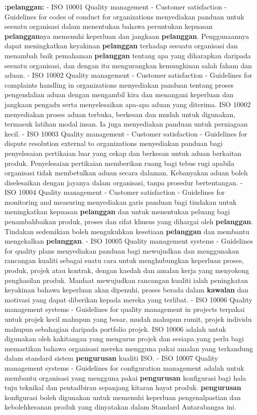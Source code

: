 \documentclass{article}
\begin{document}
\textbf{:pelanggan:} - ISO 10001 Quality management - Customer satisfaction - Guidelines for codes of
 conduct for organizations menyediakan panduan untuk sesuatu organisasi dalam
 menentukan bahawa peruntukan kepuasan \textbf{pelanggan}nya memenuhi keperluan dan
 jangkaan \textbf{pelanggan}. Penggunaannya dapat meningkatkan keyakinan \textbf{pelanggan}
 terhadap sesuatu organisasi dan menambah baik pemahaman \textbf{pelanggan} tentang apa
 yang diharapkan daripada sesuatu organisasi, dan dengan itu mengurangkan
 kemungkinan salah faham dan aduan.
- ISO 10002 Quality management - Customer satisfaction - Guidelines for complaints
 handling in organizations menyediakan panduan tentang proses pengendalian aduan
 dengan mengambil kira dan menangani keperluan dan jangkaan pengadu serta
 menyelesaikan apa-apa aduan yang diterima. ISO 10002 menyediakan proses aduan
 terbuka, berkesan dan mudah untuk digunakan, termasuk latihan modal insan. Ia juga
 menyediakan panduan untuk perniagaan kecil.
- ISO 10003 Quality management - Customer satisfaction - Guidelines for dispute
 resolution external to organizations menyediakan panduan bagi penyelesaian pertikaian
 luar yang cekap dan berkesan untuk aduan berkaitan produk. Penyelesaian pertikaian
 memberikan ruang bagi tebus rugi apabila organisasi tidak membetulkan aduan secara
 dalaman. Kebanyakan aduan boleh diselesaikan dengan jayanya dalam organisasi,
 tanpa prosedur bertentangan.
- ISO 10004 Quality management - Customer satisfaction - Guidelines for monitoring and
 measuring menyediakan garis panduan bagi tindakan untuk meningkatkan kepuasan
 \textbf{pelanggan} dan untuk menentukan peluang bagi penambahbaikan produk, proses dan
 sifat khusus yang dihargai oleh \textbf{pelanggan}. Tindakan sedemikian boleh mengukuhkan
 kesetiaan \textbf{pelanggan} dan membantu mengekalkan \textbf{pelanggan}.
- ISO 10005 Quality management systems - Guidelines for quality plans menyediakan
 panduan bagi mewujudkan dan menggunakan rancangan kualiti sebagai suatu cara
 untuk menghubungkan keperluan proses, produk, projek atau kontrak, dengan kaedah
 dan amalan kerja yang menyokong penghasilan produk. Manfaat mewujudkan rancangan
 kualiti ialah peningkatan keyakinan bahawa keperluan akan dipenuhi, proses berada
 dalam \textbf{kawalan} dan motivasi yang dapat diberikan kepada mereka yang terlibat.
- ISO 10006 Quality management systems - Guidelines for quality management in projects
 terpakai untuk projek kecil mahupun yang besar, mudah mahupun rumit, projek individu
 mahupun sebahagian daripada portfolio projek. ISO 10006 adalah untuk digunakan oleh
 kakitangan yang mengurus projek dan sesiapa yang perlu bagi memastikan bahawa
 organisasi mereka mengguna pakai amalan yang terkandung dalam standard sistem
 \textbf{pengurusan} kualiti ISO.
- ISO 10007 Quality management systems - Guidelines for configuration management
 adalah untuk membantu organisasi yang mengguna pakai \textbf{pengurusan} konfigurasi bagi
 hala tuju teknikal dan pentadbiran sepanjang kitaran hayat produk. \textbf{pengurusan}
 konfigurasi boleh digunakan untuk memenuhi keperluan pengenalpastian dan
 kebolehkesanan produk yang dinyatakan dalam Standard Antarabangsa ini.
\end{document}
